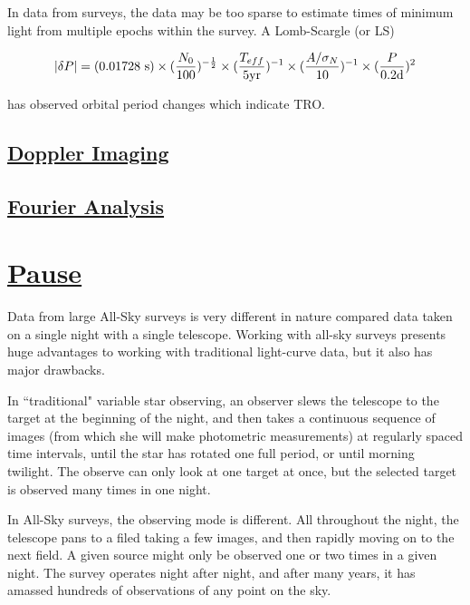 \documentclass[12pt]{article} %
\numberwithin{equation}{section} %
\begin{document}
In data from surveys, the data may be too sparse to estimate times of minimum light from multiple epochs within the survey. A Lomb-Scargle (or LS) \citep{scargle1982studies}

\citep{horne1986prescription} 

\begin{equation} \label{eqn: horne_baliunas}
|\delta P| = (0.01728\text{ s}) \times (\frac{N_{0}}{100})^{-\frac{1}{2}} \times (\frac{T_{eff}}{5\text{yr}})^{-1} \\  \times (\frac{A/ \sigma_{N}}{10})^{-1} \times (\frac{P}{0.2\text{d}})^{2}
\end{equation}


\citet{qian2001orbital} has observed orbital period changes which indicate TRO. 

\subsection[Doppler Imaging]{\hyperlink{toc}{Doppler Imaging}} \label{sec: doppler_imaging}

\subsection[Fourier Analysis]{\hyperlink{toc}{Fourier Analysis}} \label{sec: fourier_analysis}

\section[Pause]{\hyperlink{toc}{Pause}} \label{sec: pause}

Data from large All-Sky surveys is very different in nature compared data taken on a single night with a single telescope. Working with all-sky surveys presents huge advantages to working with traditional light-curve data, but it also has major drawbacks.

In ``traditional" variable star observing, an observer slews the telescope to the target at the beginning of the night, and then takes a continuous sequence of images (from which she will make photometric measurements) at regularly spaced time intervals, until the star has rotated one full period, or until morning twilight. The observe can only look at one target at once, but the selected target is observed many times in one night.

In All-Sky surveys, the observing mode is different. All throughout the night, the telescope pans to a filed taking a few images, and then rapidly moving on to the next field. A given source might only be observed one or two times in a given night. The survey operates night after night, and after many years, it has amassed hundreds of observations of any point on the sky.
\end{document}
